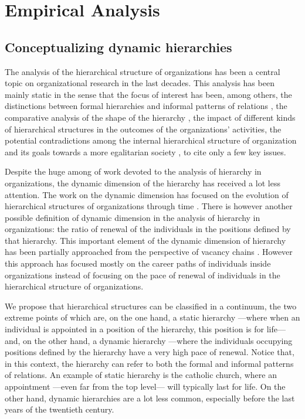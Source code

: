 
\chapter{Empirical Analysis}

\section{Conceptualizing dynamic hierarchies}

The analysis of the hierarchical structure of organizations has been a central topic on organizational research in the last decades. This analysis has been mainly static in the sense that the focus of interest has been, among others, the distinctions between formal hierarchies and informal patterns of relations \citep{krackhardt:1993, mcfarland:2001}, the comparative analysis of the shape of the hierarchy \citep{blau:1962,blau:1964}, the impact of different kinds of hierarchical structures in the outcomes of the organizations' activities, the potential contradictions among the internal hierarchical structure of organization and its goals towards a more egalitarian society \citep{michels:1915,selznick:1949}, to cite only a few key issues.

Despite the huge among of work devoted to the analysis of hierarchy in organizations, the dynamic dimension of the hierarchy has received a lot less attention. The work on the dynamic dimension has focused on the evolution of hierarchical structures of organizations through time \citep{blau:1969}. There is however another possible definition of dynamic dimension in the analysis of hierarchy in organizations: the ratio of renewal of the individuals in the positions defined by that hierarchy. This important element of the dynamic dimension of hierarchy has been partially approached from the perspective of vacancy chains \citep{white:1970,stewman:1983,padgett:1990}. However this approach has focused mostly on the career paths of individuals inside organizations instead of focusing on the pace of renewal of individuals in the hierarchical structure of organizations.

We propose that hierarchical structures can be classified in a continuum, the two extreme points of which are, on the one hand, a static hierarchy ---where when an individual is appointed in a position of the hierarchy, this position is for life--- and, on the other hand, a dynamic hierarchy ---where the individuals occupying positions defined by the hierarchy have a very high pace of renewal. Notice that, in this context, the hierarchy can refer to both the formal and informal patterns of relations. An example of static hierarchy is the catholic church, where an appointment ---even far from the top level--- will typically last for life. On the other hand, dynamic hierarchies are a lot less common, especially before the last years of the twentieth century.

